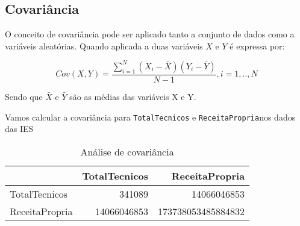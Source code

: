 \documentclass[12pt,]{style/krantz}
\makeatletter
\newenvironment{Shaded}{\begin{snugshade}}{\end{snugshade}}
\newcommand{\DataTypeTok}[1]{\textcolor[rgb]{0.13,0.29,0.53}{#1}}
\newcommand{\KeywordTok}[1]{\textcolor[rgb]{0.13,0.29,0.53}{\textbf{#1}}}
\newcommand{\NormalTok}[1]{#1}
\newcommand{\OperatorTok}[1]{\textcolor[rgb]{0.81,0.36,0.00}{\textbf{#1}}}
\newcommand{\OtherTok}[1]{\textcolor[rgb]{0.56,0.35,0.01}{#1}}
\newcommand{\StringTok}[1]{\textcolor[rgb]{0.31,0.60,0.02}{#1}}
\newenvironment{kframe}{%
\medskip{}
\setlength{\fboxsep}{.8em}
 \def\at@end@of@kframe{}%
 \ifinner\ifhmode%
  \def\at@end@of@kframe{\end{minipage}}%
  \begin{minipage}{\columnwidth}%
 \fi\fi%
 \def\FrameCommand##1{\hskip\@totalleftmargin \hskip-\fboxsep
 \colorbox{shadecolor}{##1}\hskip-\fboxsep
     \hskip-\linewidth \hskip-\@totalleftmargin \hskip\columnwidth}%
 \MakeFramed {\advance\hsize-\width
   \@totalleftmargin\z@ \linewidth\hsize
   \@setminipage}}%
 {\par\unskip\endMakeFramed%
 \at@end@of@kframe}
\renewenvironment{Shaded}{\begin{kframe}}{\end{kframe}}
\theoremstyle{definition}
\theoremstyle{definition}
\theoremstyle{definition}
\theoremstyle{remark}
\let\BeginKnitrBlock\begin \let\EndKnitrBlock\end
\makeatother
\begin{document}
\hypertarget{covariancia}{%
\subsection{Covariância}\label{covariancia}}

O conceito de covariância pode ser aplicado tanto a conjunto de dados como a variáveis aleatórias. Quando aplicada a duas variáveis \(X\) e \(Y\) é expressa por:

\[Cov(X,Y) = \frac {\sum_{i=1}^N(X_i-\bar X)(Y_i - \bar Y)}{N-1}, i=1,..,N\]

Sendo que \(\bar X\) e \(\bar Y\) são as médias das variáveis X e Y.

\BeginKnitrBlock{example}
\protect\hypertarget{exm:unnamed-chunk-68}{}{\label{exm:unnamed-chunk-68} }Vamos calcular a covariância para \texttt{TotalTecnicos} e \texttt{ReceitaPropria}nos dados das IES
\EndKnitrBlock{example}

\begin{Shaded}
\end{Shaded}

\begin{table}[!h]

\caption{\label{tab:unnamed-chunk-69}Análise de covariância}
\centering
\begin{tabular}{lrr}
\toprule
  & TotalTecnicos & ReceitaPropria\\
\midrule
TotalTecnicos & 341089 & 14066046853\\
ReceitaPropria & 14066046853 & 173738053485884832\\
\bottomrule
\end{tabular}
\end{table}
\end{document}

